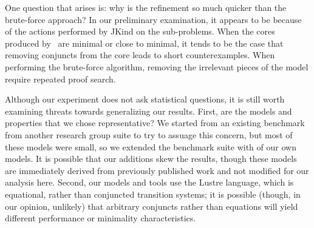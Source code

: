 One question that arises is: why is the refinement so much quicker than the brute-force approach?  In our preliminary examination, it appears to be because of the actions performed by JKind on the sub-problems.  When the cores produced by \ucalg\ are minimal or close to minimal, it tends to be the case that removing conjuncts from the core leads to short counterexamples.  When performing the brute-force algorithm, removing the irrelevant pieces of the model require repeated proof search.

Although our experiment does not ask statistical questions, it is still worth examining threats towards generalizing our results.  First, are the models and properties that we chose representative?  We started from an existing benchmark from another research group suite to try to assuage this concern, but most of these models were small, so we extended the benchmark suite with  of our own models.  It is possible that our additions skew the results, though these models are immediately derived from previously published work and not modified for our analysis here.  Second, our models and tools use the Lustre language, which is equational, rather than conjuncted transition systems; it is possible (though, in our opinion, unlikely) that arbitrary conjuncts rather than equations will yield different performance or minimality characteristics. 

